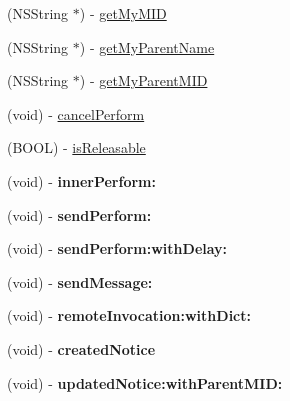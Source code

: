 \begin{DoxyCompactItemize}
(NSString $\ast$) -\/ \hyperlink{interface_messenger_system_a53fb306c1c478aafd66a039cf08e9f53}{getMyMID}
\item 
(NSString $\ast$) -\/ \hyperlink{interface_messenger_system_a8480affbc74b87d15b301d5b32681a70}{getMyParentName}
\item 
(NSString $\ast$) -\/ \hyperlink{interface_messenger_system_a59c153b480be68325af6a66f18cecd0b}{getMyParentMID}
\item 
(void) -\/ \hyperlink{interface_messenger_system_a6ffde31c3597bd083b47e30d26eb926f}{cancelPerform}
\item 
(BOOL) -\/ \hyperlink{interface_messenger_system_adcebdb1f9788a0bb75bb4c0433849ace}{isReleasable}
\item 
\hypertarget{interface_messenger_system_acd15a25f39e26b450bb1c33edd1f2d51}{
(void) -\/ {\bfseries innerPerform:}}
\label{dc/dc9/interface_messenger_system_acd15a25f39e26b450bb1c33edd1f2d51}

\item 
\hypertarget{interface_messenger_system_a60cbd00cd24aa502aa77d86e4391a1b7}{
(void) -\/ {\bfseries sendPerform:}}
\label{dc/dc9/interface_messenger_system_a60cbd00cd24aa502aa77d86e4391a1b7}

\item 
\hypertarget{interface_messenger_system_a12e9a8d84b6cb12f55bf7453166cfab1}{
(void) -\/ {\bfseries sendPerform:withDelay:}}
\label{dc/dc9/interface_messenger_system_a12e9a8d84b6cb12f55bf7453166cfab1}

\item 
\hypertarget{interface_messenger_system_a0938a6c892b3a634870238b4555dc921}{
(void) -\/ {\bfseries sendMessage:}}
\label{dc/dc9/interface_messenger_system_a0938a6c892b3a634870238b4555dc921}

\item 
\hypertarget{interface_messenger_system_a51502df160822ba7c6fd754fdc6353de}{
(void) -\/ {\bfseries remoteInvocation:withDict:}}
\label{dc/dc9/interface_messenger_system_a51502df160822ba7c6fd754fdc6353de}

\item 
\hypertarget{interface_messenger_system_a7e77f9abb100c6123caaa291d7f92ffb}{
(void) -\/ {\bfseries createdNotice}}
\label{dc/dc9/interface_messenger_system_a7e77f9abb100c6123caaa291d7f92ffb}

\item 
\hypertarget{interface_messenger_system_a28703ac96f244da4d7c62207cf65ff69}{
(void) -\/ {\bfseries updatedNotice:withParentMID:}}
\label{dc/dc9/interface_messenger_system_a28703ac96f244da4d7c62207cf65ff69}


\end{DoxyCompactItemize}

